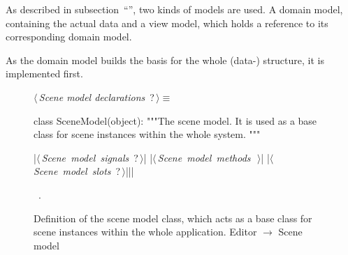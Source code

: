 \documentclass[%
    a4paper,    %
    justified,  %
    nobib,      %
    openany     %
]{tufte-book}
\begin{document}

As described in subsection~\enquote{},
two kinds of models are used. A domain model, containing the actual data and a
view model, which holds a reference to its corresponding domain model.

%

As the domain model builds the basis for the whole (data-) structure, it is
implemented first.

\begin{figure}
\begin{flushleft} \small
\begin{minipage}{\linewidth}\label{scrap21}\raggedright\small
{} $\langle\,${\itshape Scene model declarations}\nobreak\ {\footnotesize {?}}$\,\rangle\equiv$
\vspace{-1ex}
\begin{pythoncode}
class SceneModel(object):
    """The scene model.
    It is used as a base class for scene instances within the
    whole system.
    """

    |\hbox{$\langle\,${\itshape Scene model signals}\nobreak\ {\footnotesize ?}$\,\rangle$}|
    |\hbox{$\langle\,${\itshape Scene model methods}\nobreak\ {\footnotesize {}}$\,\rangle$}|
    |\hbox{$\langle\,${\itshape Scene model slots}\nobreak\ {\footnotesize ?}$\,\rangle$}||\NWsep|
\end{pythoncode}
\vspace{1.5ex}
\footnotesize
\begin{list}{}{\setlength{\itemsep}{-\parsep}\setlength{\itemindent}{-\leftmargin}}
\item \NWtxtMacroRefIn\ .

\item{}
\end{list}
\end{minipage}\vspace{4ex}
\end{flushleft}
\caption{Definition of the scene model class, which acts as a base class for
scene instances within the whole application.
  \newline{}\newline{}Editor $\rightarrow$ Scene model}
\label{editor:lst:scene-model}
\end{figure}
\end{document}
